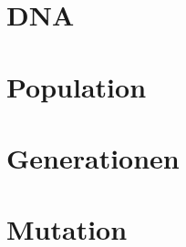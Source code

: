 
\section{DNA}
\label{ch:Evolution{\"a}rer Algorithmus:sec:DNA}




\section{Population}
\label{ch:Evolution{\"a}rer Algorithmus:sec:Population}




\section{Generationen}
\label{ch:Evolution{\"a}rer Algorithmus:sec:Generationen}




\section{Mutation}
\label{ch:Evolution{\"a}rer Algorithmus:sec:Mutation}




